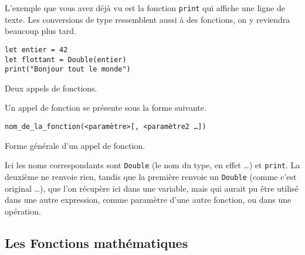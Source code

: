 L'exemple que vous avez déjà vu est la fonction \texttt{print} qui affiche une ligne de texte. Les conversions de type ressemblent aussi à des fonctions, on y reviendra beaucoup plus tard.

\begin{listing}[h]
\begin{verbatim}
let entier = 42
let flottant = Double(entier)
print("Bonjour tout le monde")
\end{verbatim}
\caption{Deux appels de fonctions.}
\end{listing}

Un appel de fonction se présente sous la forme suivante.
\begin{listing}[h]
\begin{verbatim}
nom_de_la_fonction(<paramètre>[, <paramètre2 …]) 
\end{verbatim}
\caption{Forme générale d'un appel de fonction.}
\end{listing}

Ici les noms correspondants sont \texttt{Double} (le nom du type, en effet …) et \texttt{print}. La deuxième ne renvoie rien, tandis que la première renvoie un \texttt{Double} (comme c'est original …), que l'on récupère ici dans une variable, mais qui aurait pu être utilisé dans une autre expression, comme paramètre d'une autre fonction, ou dans une opération.

\subsection{Les Fonctions mathématiques}

